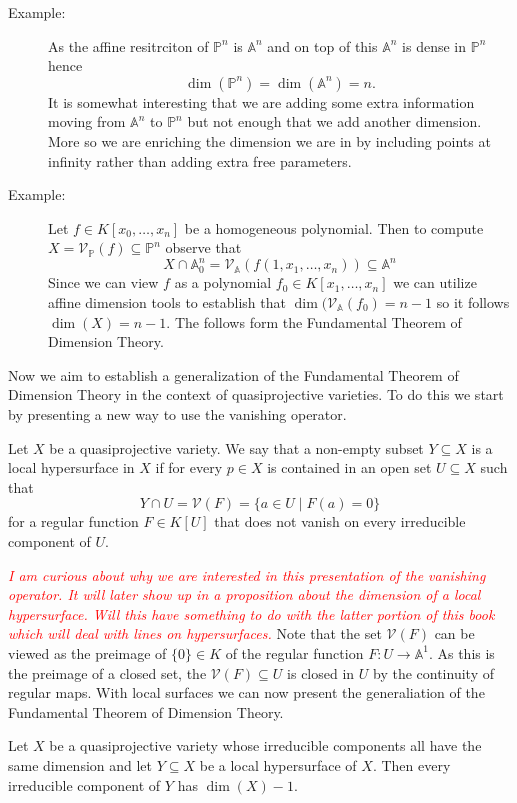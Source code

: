 \documentclass[40pt]{article}
\newcommand{\Proj}{\mathbb{P}}
\newcommand{\A}{\mathbb{A}}
\newcommand{\V}{\mathcal{V}}
\newcommand{\note}[1]{\textcolor{red}{\emph{#1}}}
\theoremstyle{remark}
\begin{document}
		\begin{description}
			\item[Example:] As the affine resitrciton of $\Proj^n$ is $\A^n$ and on top of this $\A^n$ is dense in $\Proj^n$ hence 
			\[
			\dim(\Proj^n) = \dim(\A^n) = n.
			\]
			It is somewhat interesting that we are adding some extra information moving from $\A^n$ to $\Proj^n$ but not enough that we add another dimension. More so we are enriching the dimension we are in by including points at infinity rather than adding extra free parameters.
			\item[Example:] Let $f \in K[x_0,\dots,x_n]$ be a homogeneous polynomial. Then to compute $X = \V_\Proj(f) \subseteq \Proj^n$ observe that 
			\[
			X \cap \A_0^n = \V_\A(f(1,x_1,\dots,x_n)) \subseteq \A^n
			\]
			Since we can view $f$ as a polynomial $f_0 \in K[x_1,\dots,x_n]$ we can utilize affine dimension tools to establish that $\dim(\V_\A(f_0) = n - 1$ so it follows $\dim(X) = n-1$. The follows form the Fundamental Theorem of Dimension Theory.
		\end{description}
		Now we aim to establish a generalization of the Fundamental Theorem of Dimension Theory in the context of quasiprojective varieties. To do this we start by presenting a new way to use the vanishing operator. 
		\begin{newdef}
			Let $X$ be a quasiprojective variety. We say that a non-empty subset $Y \subseteq X$ is a local hypersurface in $X$ if for every $p \in X$ is contained in an open set $U \subseteq X$ such that 
			\[
			Y \cap U = \V(F) = \{a \in U \; | \; F(a) = 0\}
			\]
			for a regular function $F \in K[U]$ that does not vanish on every irreducible component of $U$. 
		\end{newdef}
		\note{I am curious about why we are interested in this presentation of the vanishing operator. It will later show up  in a proposition about the dimension of a local hypersurface. Will this have something to do with the latter portion of this book which will deal with lines on hypersurfaces.} Note that the set $\V(F)$ can be viewed as the preimage of $\{0\} \in K$ of the regular function $F : U \to \A^1$. As this is the preimage of a closed set, the $\V(F) \subseteq U$  is closed in $U$ by the continuity of regular maps. With local surfaces we can now present the generaliation of the Fundamental Theorem of Dimension Theory. 
		\begin{prop}
			Let $X$ be a quasiprojective variety whose irreducible components all have the same dimension and let $Y \subseteq X$ be a local hypersurface of $X$. Then every irreducible component of $Y$ has $\dim(X)  -1$. 
		\end{prop}
\end{document}
